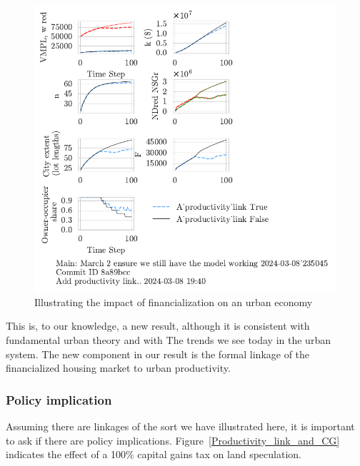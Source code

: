 \begin{figure}[h!tb]\label{fig-impact-channel-example}
    \centering
    \includegraphics[scale=1, trim=.25cm 2cm .25cm .25cm, clip]{fig/productivity_link.pdf}
    \caption{Illustrating the impact of financialization on an urban economy}
\end{figure}
This is, to our knowledge, a new result, although it is consistent with fundamental urban theory and with The trends we see today in the urban system. The new component in our result is the formal linkage of the financialized housing market to urban productivity.

\subsubsection{Policy implication}
Assuming there are linkages of the sort we have illustrated here, it is important to ask if there are policy implications. Figure~\ref{Productivity_link_and_CG} indicates the effect of a 100\% capital gains tax on land speculation. 

